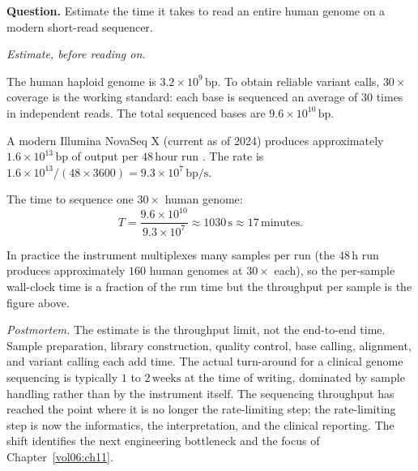 \begin{estimation}
\textbf{Question.} Estimate the time it takes to read an entire human
genome on a modern short-read sequencer.

\smallskip
\textit{Estimate, before reading on.}

\smallskip
The human haploid genome is $3.2 \times 10^9\,\text{bp}$. To obtain
reliable variant calls, $30\times$ coverage is the working standard:
each base is sequenced an average of $30$ times in independent reads.
The total sequenced bases are $9.6 \times 10^{10}\,\text{bp}$.

A modern Illumina NovaSeq X (current as of 2024) produces approximately
$1.6 \times 10^{13}\,\text{bp}$ of output per $48\,\text{hour}$ run
\cite{paper:v6c03-illumina-novaseq-2024}. The rate is
$1.6 \times 10^{13} / (48 \times 3600) = 9.3 \times 10^7\,
\text{bp}/\text{s}$.

The time to sequence one $30\times$ human genome:
\[
T = \frac{9.6 \times 10^{10}}{9.3 \times 10^7} \approx 1030\,\text{s} \approx 17\,\text{minutes}.
\]

In practice the instrument multiplexes many samples per run (the
$48\,\text{h}$ run produces approximately $160$ human genomes at
$30\times$ each), so the per-sample wall-clock time is a fraction of
the run time but the throughput per sample is the figure above.

\smallskip
\textit{Postmortem.} The estimate is the throughput limit, not the
end-to-end time. Sample preparation, library construction, quality
control, base calling, alignment, and variant calling each add
time. The actual turn-around for a clinical genome sequencing is
typically $1$ to $2\,\text{weeks}$ at the time of writing, dominated
by sample handling rather than by the instrument itself. The
sequencing throughput has reached the point where it is no longer
the rate-limiting step; the rate-limiting step is now the
informatics, the interpretation, and the clinical reporting. The
shift identifies the next engineering bottleneck and the focus of
Chapter~\ref{vol06:ch11}.
\end{estimation}

